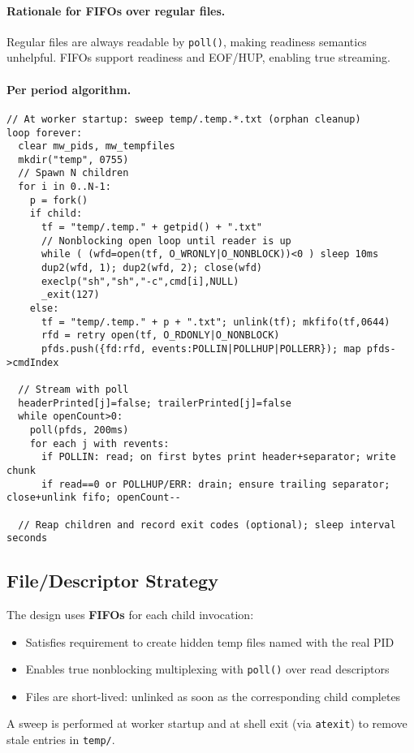 \documentclass[11pt,a4paper]{article}
\begin{document}
\paragraph{Rationale for FIFOs over regular files.} Regular files are always readable by \texttt{poll()}, making readiness semantics unhelpful. FIFOs support readiness and EOF/HUP, enabling true streaming.

\paragraph{Per period algorithm.}
\begin{lstlisting}[style=code]
// At worker startup: sweep temp/.temp.*.txt (orphan cleanup)
loop forever:
  clear mw_pids, mw_tempfiles
  mkdir("temp", 0755)
  // Spawn N children
  for i in 0..N-1:
    p = fork()
    if child:
      tf = "temp/.temp." + getpid() + ".txt"
      // Nonblocking open loop until reader is up
      while ( (wfd=open(tf, O_WRONLY|O_NONBLOCK))<0 ) sleep 10ms
      dup2(wfd, 1); dup2(wfd, 2); close(wfd)
      execlp("sh","sh","-c",cmd[i],NULL)
      _exit(127)
    else:
      tf = "temp/.temp." + p + ".txt"; unlink(tf); mkfifo(tf,0644)
      rfd = retry open(tf, O_RDONLY|O_NONBLOCK)
      pfds.push({fd:rfd, events:POLLIN|POLLHUP|POLLERR}); map pfds->cmdIndex

  // Stream with poll
  headerPrinted[j]=false; trailerPrinted[j]=false
  while openCount>0:
    poll(pfds, 200ms)
    for each j with revents:
      if POLLIN: read; on first bytes print header+separator; write chunk
      if read==0 or POLLHUP/ERR: drain; ensure trailing separator; close+unlink fifo; openCount--

  // Reap children and record exit codes (optional); sleep interval seconds
\end{lstlisting}

\subsection{File/Descriptor Strategy}
The design uses \textbf{FIFOs} for each child invocation:
\begin{itemize}[leftmargin=*]
  \item Satisfies requirement to create hidden temp files named with the real PID
  \item Enables true nonblocking multiplexing with \texttt{poll()} over read descriptors
  \item Files are short-lived: unlinked as soon as the corresponding child completes
\end{itemize}
A sweep is performed at worker startup and at shell exit (via \texttt{atexit}) to remove stale entries in \texttt{temp/}.
\end{document}

